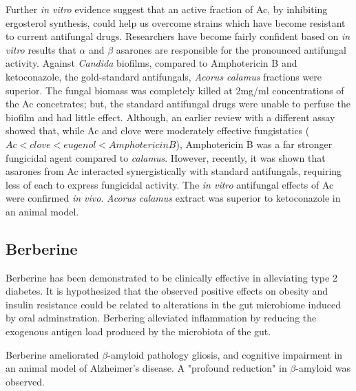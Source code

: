 Further \textit{in vitro} evidence suggest that
an active fraction of Ac,
by inhibiting ergosterol synthesis,
could help us overcome strains which have become
resistant to current antifungal drugs.
\cite{
subha2008effect,
subha2009vitro}
Researchers have become fairly confident based on \textit{in vitro}
results that $\alpha$ and $\beta$ asarones are responsible for
the pronounced antifungal activity.
\cite{devi2009antimicrobial}
Against \textit{Candida} biofilms,
compared to Amphotericin B and ketoconazole, the gold-standard antifungals,
\textit{Acorus calamus} fractions were superior.
The fungal biomass was completely killed at 2mg/ml concentrations
of the Ac concetrates; but, the standard antifungal drugs
were unable to perfuse the biofilm and had little effect.
\cite{subha2009candida}
Although, an earlier review with a different assay
showed that, while Ac and clove were moderately effective fungistatics
($Ac < clove < eugenol < Amphotericin B$),
Amphotericin B was a far stronger fungicidal agent
compared to \textit{calamus}.
\cite{thirach2003antifungal}
However, recently,
it was shown that asarones from Ac interacted
synergistically with standard antifungals,
requiring less of each to express fungicidal activity.
\cite{kumar2015asarones}
The \textit{in vitro} antifungal effects of Ac
were confirmed \textit{in vivo}.
\textit{Acorus calamus} extract
was superior to ketoconazole in an animal model.
\cite{subha2009combating}








\subsection{Berberine}


Berberine has been demonstrated to be clinically effective
in alleviating type 2 diabetes.
It is hypothesized that the observed positive effects
on obesity and insulin resistance could be related
to alterations in the gut microbiome induced by oral adminstration.
Berbering alleviated inflammation by reducing the exogenous antigen load
produced by the microbiota of the gut.
\cite{zhang2012structural}


Berberine ameliorated $\beta$-amyloid pathology
gliosis, and cognitive impairment in an
animal model of Alzheimer's disease.
A "profound reduction" in $\beta$-amyloid was observed.
\cite{durairajan2012berberine}

